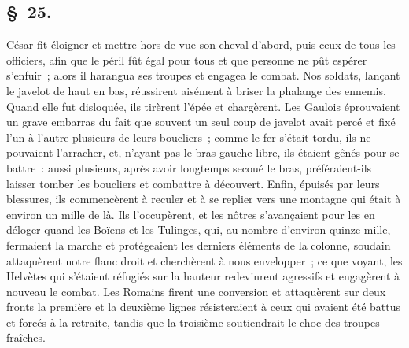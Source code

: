 \documentclass[french,twoside]{book} %
\begin{document}
\subsection[{§ 25.}]{ \textsc{§ 25.} }
\noindent César fit éloigner et mettre hors de vue son cheval d’abord, puis ceux de tous les officiers, afin que le péril fût égal pour tous et que personne ne pût espérer s’enfuir ; alors il harangua ses troupes et engagea le combat. Nos soldats, lançant le javelot de haut en bas, réussirent aisément à briser la phalange des ennemis. Quand elle fut disloquée, ils tirèrent l’épée et chargèrent. Les Gaulois éprouvaient un grave embarras du fait que souvent un seul coup de javelot avait percé et fixé l’un à l’autre plusieurs de leurs boucliers ; comme le fer s’était tordu, ils ne pouvaient l’arracher, et, n’ayant pas le bras gauche libre, ils étaient gênés pour se battre : aussi plusieurs, après avoir longtemps secoué le bras, préféraient-ils laisser tomber les boucliers et combattre à découvert. Enfin, épuisés par leurs blessures, ils commencèrent à reculer et à se replier vers une montagne qui était à environ un mille de là. Ils l’occupèrent, et les nôtres s’avançaient pour les en déloger quand les Boïens et les Tulinges, qui, au nombre d’environ quinze mille, fermaient la marche et protégeaient les derniers éléments de la colonne, soudain attaquèrent notre flanc droit et cherchèrent à nous envelopper ; ce que voyant, les Helvètes qui s’étaient réfugiés sur la hauteur redevinrent agressifs et engagèrent à nouveau le combat. Les Romains firent une conversion et attaquèrent sur deux fronts la première et la deuxième lignes résisteraient à ceux qui avaient été battus et forcés à la retraite, tandis que la troisième soutiendrait le choc des troupes fraîches.
\end{document}
